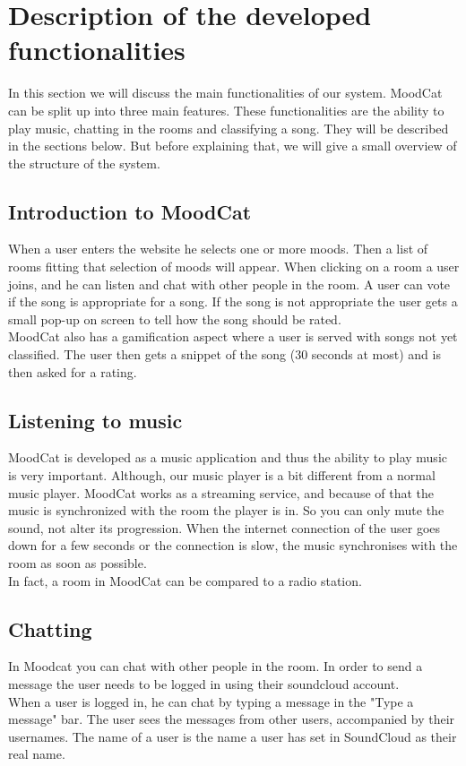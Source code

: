 \chapter{Description of the developed functionalities}

In this section we will discuss the main functionalities of our system.
MoodCat can be split up into three main features.
These functionalities are the ability to play music, chatting in the rooms and classifying a song.
They will be described in the sections below.
But before explaining that, we will give a small overview of the structure of the system.

\section{Introduction to MoodCat}
When a user enters the website he selects one or more moods. 
Then a list of rooms fitting that selection of moods will appear.
When clicking on a room a user joins, and he can listen and chat with other people in the room.
A user can vote if the song is appropriate for a song. If the song is not appropriate the user gets a small pop-up on screen to tell how the song should be rated.
\\
MoodCat also has a gamification aspect where a user is served with songs not yet classified. The user then gets a snippet of the song (30 seconds at most) and is then asked for a rating.

\section{Listening to music}
MoodCat is developed as a music application and thus the ability to play music is very important.
Although, our music player is a bit different from a normal music player.
MoodCat works as a streaming service, and because of that the music is synchronized with the room the player is in.  
So you can only mute the sound, not alter its progression.
When the internet connection of the user goes down for a few seconds or the connection is slow, the music synchronises with the room as soon as possible.\\
In fact, a room in MoodCat can be compared to a radio station.

\section{Chatting}
In Moodcat you can chat with other people in the room.
In order to send a message the user needs to be logged in using their soundcloud account.
\\
When a user is logged in, he can chat by typing a message in the "Type a message" bar.
The user sees the messages from other users, accompanied by their usernames.
The name of a user is the name a user has set in SoundCloud as their real name.

